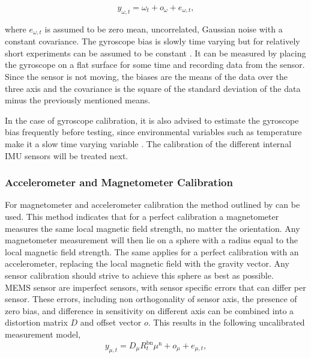 \begin{equation}
	y_{\omega, t}=\omega_{t}+o_{\omega}+e_{\omega, t},
\end{equation}

where $e_{\omega, t}$ is assumed to be zero mean, uncorrelated, Gaussian noise with a constant covariance. The gyroscope bias is slowly time varying but for relatively short experiments can be assumed to be constant \cite{Kok2016}. It can be measured by placing the gyroscope on a flat surface for some time and recording data from the sensor. Since the sensor is not moving, the biases are the means of the data over the three axis and the covariance is the square of the standard deviation of the data minus the previously mentioned means.\par 

In the case of gyroscope calibration, it is also advised to estimate the gyroscope bias frequently before testing, since environmental variables such as temperature make it a slow time varying variable \cite{Kok2017}. The calibration of the different internal IMU sensors will be treated next. 

\subsubsection{Accelerometer and Magnetometer Calibration}

For magnetometer and accelerometer calibration the method outlined by \citet{Kok2016} can be used. This method indicates that for a perfect calibration a magnetometer measures the same local magnetic field strength, no matter the orientation. Any magnetometer measurement will then lie on a sphere with a radius  equal to the local magnetic field strength. The same applies for a perfect calibration with an accelerometer, replacing the local magnetic field with the gravity vector. Any sensor calibration should strive to achieve this sphere as best as possible.\\
MEMS sensor are imperfect sensors, with sensor specific errors that can differ per sensor. These errors, including non orthogonality of sensor axis, the presence of zero bias, and difference in sensitivity on different axis \cite{Kok2016} can be combined into a distortion matrix $D$ and offset vector $o$.
This results in the following uncalibrated measurement model,
\begin{equation}
	y_{\mu, t}=D_\mu R_{t}^{\mathrm{bn}} \mu^{\mathrm{n}}+o_\mu +e_{\mu, t},
\end{equation}

